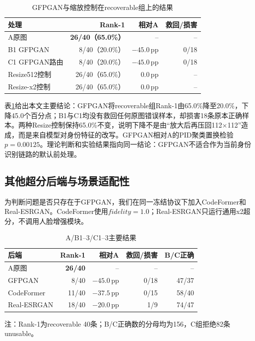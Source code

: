 \documentclass[UTF8,a4paper,10pt]{ctexart}
\newcommand{\pp}{\,\mathrm{pp}}
\begin{document}
\begin{table}[!htbp]
\centering
\caption{GFPGAN与缩放控制在recoverable组上的结果}
\label{tab:gfpgan-result}
\small
\begin{tabular}{lrrr}
\toprule
处理 & Rank-1 & 相对A & 救回/损害\\
\midrule
A原图 & \textbf{26/40（65.0\%）} & -- & --\\
B1 GFPGAN & 8/40（20.0\%） & $-45.0\pp$ & 0/18\\
C1 GFPGAN路由 & 8/40（20.0\%） & $-45.0\pp$ & 0/18\\
Resize512控制 & 26/40（65.0\%） & $0.0\pp$ & --\\
Resize-x2控制 & 26/40（65.0\%） & $0.0\pp$ & --\\
\bottomrule
\end{tabular}
\end{table}

表\ref{tab:gfpgan-result}给出本文主要结论：GFPGAN将recoverable组Rank-1由65.0\%降至20.0\%，下降45.0个百分点；B1与C1均没有救回任何原图错误样本，却损害18条原本正确样本。两种Resize控制保持65.0\%不变，说明下降不是由“放大后再压回112$\times$112”造成，而是来自模型对身份特征的改写。GFPGAN相对A的PID聚类置换检验$p=0.00125$。理论判断和实验结果指向同一结论：GFPGAN不适合作为当前身份识别链路的默认前处理。

\subsection{其他超分后端与场景适配性}

为判断问题是否只存在于GFPGAN，我们在同一冻结协议下加入CodeFormer\cite{codeformer}和Real-ESRGAN\cite{realesrgan}。CodeFormer使用$fidelity=1.0$；Real-ESRGAN只运行通用x2超分，不调用人脸增强模块。

\begin{table}[!htbp]
\centering
\caption{A/B1--3/C1--3主要结果}
\label{tab:multi-result}
\small
\begin{tabular}{lrrrr}
\toprule
后端 & Rank-1 & 相对A & 救回/损害 & B/C正确\\
\midrule
A原图 & \textbf{26/40} & -- & -- & --\\
GFPGAN & 8/40 & $-45.0\pp$ & 0/18 & 47/37\\
CodeFormer & 11/40 & $-37.5\pp$ & 0/15 & 58/40\\
Real-ESRGAN & 18/40 & $-20.0\pp$ & 1/9 & 74/47\\
\bottomrule
\end{tabular}
\par\vspace{0.2em}
\parbox{0.78\linewidth}{\raggedright\scriptsize 注：Rank-1为recoverable 40条；B/C正确数的分母均为156，C组拒绝82条unusable。}
\end{table}
\end{document}
